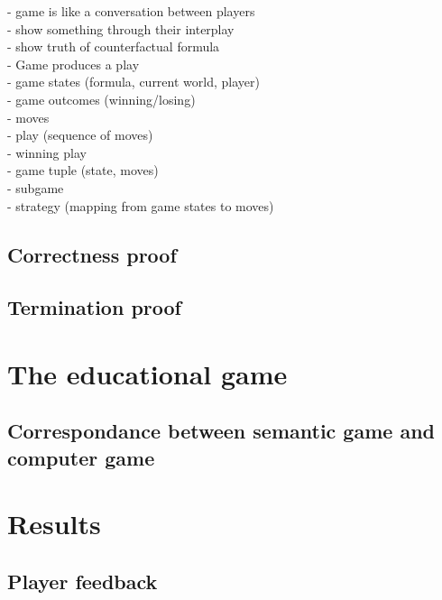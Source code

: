 \documentclass[a4paper,american]{paper}
\theoremstyle{definition}\newtheorem{definition}{Definition}
\begin{document}
- game is like a conversation between players\\
- show something through their interplay\\
- show truth of counterfactual formula\\
- Game produces a play\\
- game states (formula, current world, player)\\
- game outcomes (winning/losing)\\
- moves\\
- play (sequence of moves)\\
- winning play\\
- game tuple (state, moves)\\
- subgame\\
- strategy (mapping from game states to moves)\\
\subsection{Correctness proof}
\subsection{Termination proof}

\section{The educational game}
\subsection{Correspondance between semantic game and computer game}
\section{Results}
\subsection{Player feedback}

\nocite{*}

\end{document}

